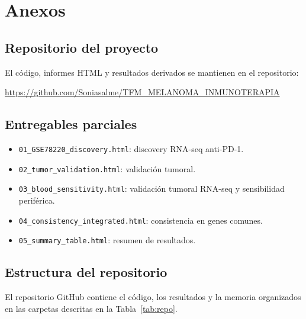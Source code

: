 \chapter{Anexos}

\section{Repositorio del proyecto}

El código, informes HTML y resultados derivados se mantienen en el repositorio:

\begin{center}
\url{https://github.com/Soniasalme/TFM_MELANOMA_INMUNOTERAPIA}
\end{center}

\section{Entregables parciales}

\begin{itemize}
    \item \texttt{01\_GSE78220\_discovery.html}: discovery RNA-seq anti-PD-1.
    \item \texttt{02\_tumor\_validation.html}: validación tumoral.
    \item \texttt{03\_blood\_sensitivity.html}: validación tumoral RNA-seq y sensibilidad periférica.
    \item \texttt{04\_consistency\_integrated.html}: consistencia en genes comunes.
    \item \texttt{05\_summary\_table.html}: resumen de resultados.
\end{itemize}

\section{Estructura del repositorio}

El repositorio GitHub contiene el código, los resultados y la memoria organizados en las carpetas descritas en la Tabla~\ref{tab:repo}.

